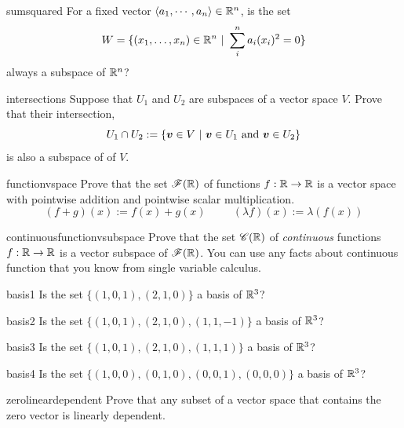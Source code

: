 \begin{problem}{sumsquared}
    For a fixed vector $\langle a_1, \cdots, a_n \rangle \in \mathbb{R}^n$, is the set $$W = \{(x_1, \dots, x_n) \in \mathbb{R}^n \ | \ \sum^n_i a_i(x_i)^2 = 0 \}$$ always a subspace of $\mathbb{R}^n$?
\end{problem}

\begin{problem}{intersections}
    Suppose that $U_1$ and $U_2$ are subspaces of a vector space $V$.  Prove that their intersection, $$U_1 \cap U_2 := \{\bm{v} \in V \ | \ \bm{v} \in U_1 \textnormal{ and } \bm{v} \in U_2\}$$ is also a subspace of of $V$.
\end{problem}

\begin{problem}{functionvspace}
    Prove that the set $\mathscr{F}(\mathbb{R})$ of functions $f : \mathbb{R} \to \mathbb{R}$ is a vector space with pointwise addition and pointwise scalar multiplication.  $$(f + g)(x) := f(x) + g(x) \ \qquad \ (\lambda f)(x) := \lambda (f(x))$$
\end{problem}

\begin{problem}{continuousfunctionvsubspace}
    Prove that the set $\mathscr{C}(\mathbb{R})$ of \textit{continuous }functions $f : \mathbb{R} \to \mathbb{R}$ is a vector subspace of $\mathscr{F}(\mathbb{R})$.  You can use any facts about continuous function that you know from single variable calculus.
\end{problem}


\begin{problem}{basis1}
Is the set $\{(1,0,1), (2,1,0) \}$ a basis of $\mathbb{R}^3$?
\end{problem}

\begin{problem}{basis2}
Is the set $\{(1,0,1), (2,1,0), (1,1,-1) \}$ a basis of $\mathbb{R}^3$?
\end{problem}

\begin{problem}{basis3}
Is the set $\{(1,0,1), (2,1,0), (1,1,1) \}$ a basis of $\mathbb{R}^3$?
\end{problem}

\begin{problem}{basis4}
Is the set $\{(1,0,0), (0,1,0), (0,0,1), (0,0,0) \}$ a basis of $\mathbb{R}^3$?
\end{problem}

\begin{problem}{zerolineardependent}
Prove that any subset of a vector space that contains the zero vector is linearly
dependent.
\end{problem}

